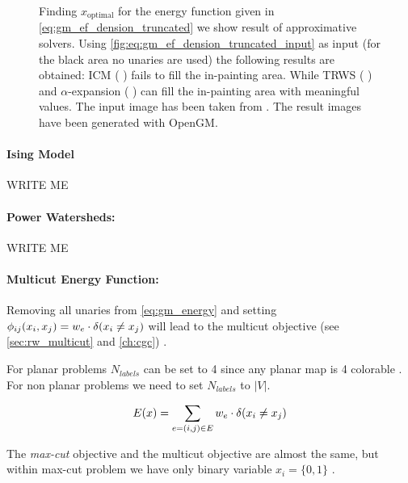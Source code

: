 \begin{figure}[H]
{    }
    \caption[Energy based truncated denoising]{
        Finding $x_{\text{optimal}} $ for the energy function given
        in \cref{eq:gm_ef_dension_truncated} we show result of approximative solvers.
        Using \cref{fig:eq:gm_ef_dension_truncated_input} as input (for the black area no unaries 
        are used)
        the following
        results are obtained: ICM \citep{besag_1986_icm}  ( ) fails
        to fill the in-painting area. While TRWS \cite{kolmogorov_2006_pami_trws}  ( ) 
        and $\alpha$-expansion \cite{boykov_2001_pami}  ( ) can fill the in-painting area
        with meaningful values.
        The input image has been taken from \citep{szeliski_2008_pami}.
        The result images have been generated with OpenGM.
    }\label{fig:gm_ef_dension_truncated}
\end{figure}


\paragraph{Ising Model}
    WRITE ME

\paragraph{Power Watersheds:}
    WRITE ME

\paragraph{Multicut Energy Function:}
Removing all unaries from \cref{eq:gm_energy} and 
setting $\phi_{ij}(x_i,x_j) =   w_e \cdot \delta( x_i \neq x_j )$ 
will lead to the multicut objective (see \cref{sec:rw_multicut} and \cref{ch:cgc}) .

For planar problems  $N_{labels}$ can be set to 4 since any planar map is 4 colorable \citep{appel_1977_4color}.
For non planar problems we need to set $N_{labels}$ to $|V|$.



\begin{align}
E(x)=
    \sum_{ e=(i,j) \in E}
        w_e \cdot \delta( x_i \neq x_j )
    \label{eq:gm_ef_multicut}
\end{align}


The \emph{max-cut} objective and  the multicut objective
are almost the same, 
but within max-cut problem we have only binary variable $x_i=\{0,1\}$ .

